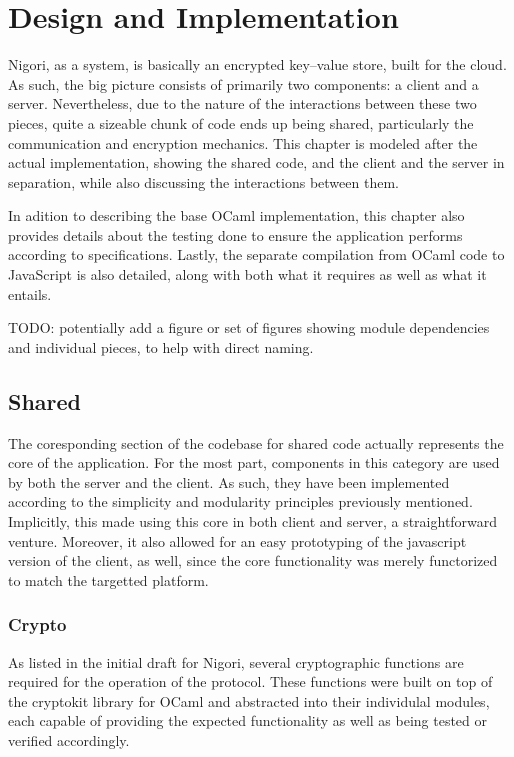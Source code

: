\chapter{Design and Implementation}
Nigori, as a system, is basically an encrypted key--value store, built for the cloud.
As such, the big picture consists of primarily two components: a client and a server.
Nevertheless, due to the nature of the interactions between these two pieces, quite a sizeable chunk of code ends up being shared, particularly the communication and encryption mechanics.
This chapter is modeled after the actual implementation, showing the shared code, and the client and the server in separation, while also discussing the interactions between them.

In adition to describing the base OCaml implementation, this chapter also provides details about the testing done to ensure the application performs according to specifications.
Lastly, the separate compilation from OCaml code to JavaScript is also detailed, along with both what it requires as well as what it entails.

TODO: potentially add a figure or set of figures showing module dependencies and individual pieces, to help with direct naming.

\section{Shared}
The coresponding section of the codebase for shared code actually represents the core of the application.
For the most part, components in this category are used by both the server and the client.
As such, they have been implemented according to the simplicity and modularity principles previously mentioned.
Implicitly, this made using this core in both client and server, a straightforward venture.
Moreover, it also allowed for an easy prototyping of the javascript version of the client, as well, since the core functionality was merely functorized to match the targetted platform.

\subsection{Crypto}
As listed in the initial draft for Nigori, several cryptographic functions are required for the operation of the protocol.
These functions were built on top of the cryptokit library for OCaml and abstracted into their individulal modules, each capable of providing the expected functionality as well as being tested or verified accordingly.

